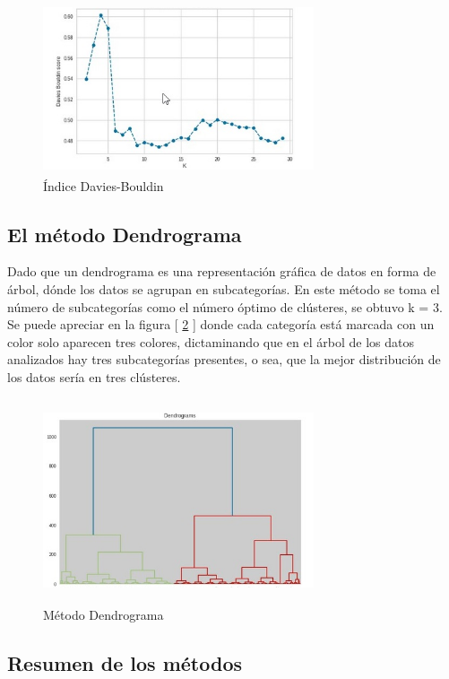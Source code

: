 \begin{figure}[h!]
	\centering
	\includegraphics[width=8cm, height=5cm]{Images/DIndex.jpg} 
	\caption{Índice Davies-Bouldin}
	\label{fig:DI}
\end{figure}
\subsection{El método Dendrograma}
Dado que un dendrograma es una representación gráfica de datos en forma de árbol, dónde los datos se agrupan en subcategorías. En este método se toma el número de subcategorías como el número óptimo de clústeres, se obtuvo k = 3. Se puede apreciar en la figura [ \ref*{fig:Dend} ] donde cada categoría está marcada con un color solo aparecen tres colores, dictaminando que en el árbol de los datos analizados hay tres subcategorías presentes, o sea, que la mejor distribución de los datos sería en tres clústeres.

\begin{figure}[h!]
	\centering
	\includegraphics[width=8cm, height=6cm]{Images/Dendograma.jpg} 
	\caption{Método Dendrograma}
	\label{fig:Dend}
\end{figure}

\subsection{Resumen de los métodos}

